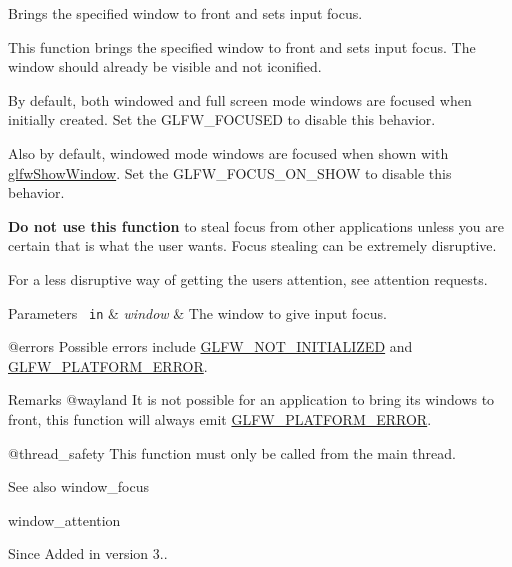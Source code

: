 Brings the specified window to front and sets input focus. 

This function brings the specified window to front and sets input focus. The window should already be visible and not iconified.

By default, both windowed and full screen mode windows are focused when initially created. Set the G\+L\+F\+W\+\_\+\+F\+O\+C\+U\+S\+ED to disable this behavior.

Also by default, windowed mode windows are focused when shown with \mbox{\hyperlink{group__window_ga7945bcdff9e5e058cf36505d6873ed8c}{glfw\+Show\+Window}}. Set the G\+L\+F\+W\+\_\+\+F\+O\+C\+U\+S\+\_\+\+O\+N\+\_\+\+S\+H\+OW to disable this behavior.

{\bfseries{Do not use this function}} to steal focus from other applications unless you are certain that is what the user wants. Focus stealing can be extremely disruptive.

For a less disruptive way of getting the user\textquotesingle{}s attention, see attention requests.


\begin{DoxyParams}[1]{Parameters}
\mbox{\texttt{ in}}  & {\em window} & The window to give input focus.\\
\hline
\end{DoxyParams}
@errors Possible errors include \mbox{\hyperlink{group__errors_ga2374ee02c177f12e1fa76ff3ed15e14a}{G\+L\+F\+W\+\_\+\+N\+O\+T\+\_\+\+I\+N\+I\+T\+I\+A\+L\+I\+Z\+ED}} and \mbox{\hyperlink{group__errors_gad44162d78100ea5e87cdd38426b8c7a1}{G\+L\+F\+W\+\_\+\+P\+L\+A\+T\+F\+O\+R\+M\+\_\+\+E\+R\+R\+OR}}.

\begin{DoxyRemark}{Remarks}
@wayland It is not possible for an application to bring its windows to front, this function will always emit \mbox{\hyperlink{group__errors_gad44162d78100ea5e87cdd38426b8c7a1}{G\+L\+F\+W\+\_\+\+P\+L\+A\+T\+F\+O\+R\+M\+\_\+\+E\+R\+R\+OR}}.
\end{DoxyRemark}
@thread\+\_\+safety This function must only be called from the main thread.

\begin{DoxySeeAlso}{See also}
window\+\_\+focus 

window\+\_\+attention
\end{DoxySeeAlso}
\begin{DoxySince}{Since}
Added in version 3.. 
\end{DoxySince}
\mbox{\label{group__window_gaf7d17f3534b4b6dc9a6f905e3a240b7e}} 
